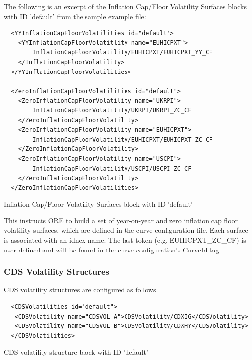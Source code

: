 \documentclass[12pt, a4paper]{article}
\begin{document}
{The following is an excerpt of the Inflation Cap/Floor Volatility Surfaces blocks with ID 'default' from the sample example
file:

{
\begin{listing}[H]
\begin{verbatim}
  <YYInflationCapFloorVolatilities id="default">
    <YYInflationCapFloorVolatitlity name="EUHICPXT">
        InflationCapFloorVolatility/EUHICPXT/EUHICPXT_YY_CF
    </InflationCapFloorVolatility>
  </YYInflationCapFloorVolatilities>

  <ZeroInflationCapFloorVolatilities id="default">
    <ZeroInflationCapFloorVolatility name="UKRPI">
        InflationCapFloorVolatility/UKRPI/UKRPI_ZC_CF
    </ZeroInflationCapFloorVolatility>
    <ZeroInflationCapFloorVolatility name="EUHICPXT">
        InflationCapFloorVolatility/EUHICPXT/EUHICPXT_ZC_CF
    </ZeroInflationCapFloorVolatility>
    <ZeroInflationCapFloorVolatility name="USCPI">
        InflationCapFloorVolatility/USCPI/USCPI_ZC_CF
    </ZeroInflationCapFloorVolatility>
  </ZeroInflationCapFloorVolatilities>
\end{verbatim}
\caption{Inflation Cap/Floor Volatility Surfaces block with ID 'default'}
\label{lst:inflation_cap_floor_surface_spec}
\end{listing}

This instructs ORE to build a set of year-on-year and zero inflation cap floor volatility surfaces, which are defined in the curve
configuration file. Each surface is associated with an idnex name. The last token (e.g. EUHICPXT\_ZC\_CF) is user defined
and will be found in the curve configuration's CurveId tag.

\subsubsection{CDS Volatility Structures}

CDS volatility structures are configured as follows
\begin{listing}[H]
\begin{verbatim}
  <CDSVolatilities id="default">
   <CDSVolatility name="CDSVOL_A">CDSVolatility/CDXIG</CDSVolatility>
   <CDSVolatility name="CDSVOL_B">CDSVolatility/CDXHY</CDSVolatility>
  </CDSVolatilities>
\end{verbatim}
\caption{CDS volatility structure block with ID 'default'}
\label{lst:cdsvol_spec}
\end{listing}

}}
\end{document}
